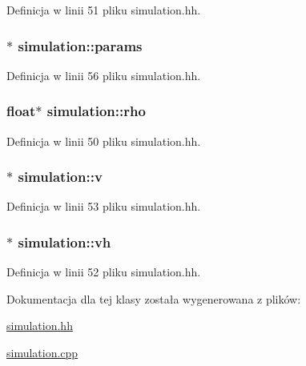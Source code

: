 Definicja w linii 51 pliku simulation.\-hh.

\hypertarget{classsimulation_a861b82cc3c0e7e58abfba464a133dae3}{
\subsubsection[{params}]{$\ast$ simulation\-::params\hspace{0.3cm}{\ttfamily [private]}}}\label{classsimulation_a861b82cc3c0e7e58abfba464a133dae3}


Definicja w linii 56 pliku simulation.\-hh.

\hypertarget{classsimulation_a44081d4edd92e17a3e1067b976031a00}{
\subsubsection[{rho}]{\setlength{\rightskip}{0pt plus 5cm}float$\ast$ simulation\-::rho\hspace{0.3cm}{\ttfamily [private]}}}\label{classsimulation_a44081d4edd92e17a3e1067b976031a00}


Definicja w linii 50 pliku simulation.\-hh.

\hypertarget{classsimulation_a39dbad79b1b8667840638a35e839a3f7}{
\subsubsection[{v}]{$\ast$ simulation\-::v\hspace{0.3cm}{\ttfamily [private]}}}\label{classsimulation_a39dbad79b1b8667840638a35e839a3f7}


Definicja w linii 53 pliku simulation.\-hh.

\hypertarget{classsimulation_ae6da1f15728f49be7b0793700866ede9}{
\subsubsection[{vh}]{$\ast$ simulation\-::vh\hspace{0.3cm}{\ttfamily [private]}}}\label{classsimulation_ae6da1f15728f49be7b0793700866ede9}


Definicja w linii 52 pliku simulation.\-hh.



Dokumentacja dla tej klasy została wygenerowana z plików\-:\begin{DoxyCompactItemize}
\item 
\hyperlink{simulation_8hh}{simulation.\-hh}\item 
\hyperlink{simulation_8cpp}{simulation.\-cpp}\end{DoxyCompactItemize}
